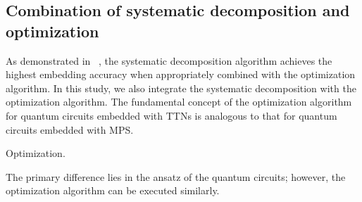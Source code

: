 \documentclass[12pt,dvipdfmx,twoside,openright]{report}
\begin{document}
\subsection{Combination of systematic decomposition and optimization}
As demonstrated in ~\cite{mpsdecomp}, the systematic decomposition algorithm achieves the highest embedding accuracy when appropriately combined with the optimization algorithm.
In this study, we also integrate the systematic decomposition with the optimization algorithm.
The fundamental concept of the optimization algorithm for quantum circuits embedded with TTNs is analogous to that for quantum circuits embedded with MPS. 
\begin{algorithm}[tbp]
 \caption{Optimization.}
 \label{algorithm:optimization}
\end{algorithm}
The primary difference lies in the ansatz of the quantum circuits; however, the optimization algorithm can be executed similarly.
\end{document}
